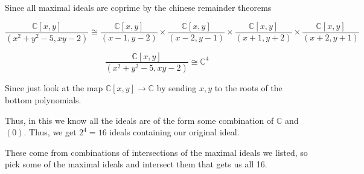 \documentclass[12pt, letterpaper]{article}
\newcommand{\C}{\mathbb{C}}
\begin{document}
Since all maximal ideals are coprime by the chinese remainder theorems

\[\dfrac{\C[x,y]}{(x^2+y^2-5,xy-2)} \cong \dfrac{\C[x,y]}{(x-1,y-2)} \times \dfrac{\C[x,y]}{(x-2,y-1)} \times \dfrac{\C[x,y]}{(x+1,y+2)} \times \dfrac{\C[x,y]}{(x+2,y+1)}\]

\[\dfrac{\C[x,y]}{(x^2+y^2-5,xy-2)} \cong \C^4\]

Since just look at the map $\C[x,y] \to \C$ by sending $x,y$ to the roots of the bottom polynomials.

Thus, in this we know all the ideals are of the form some combination of $\C$ and $(0)$. Thus, we get $2^4=16$ ideals containing our original ideal.

These come from combinations of intersections of the maximal ideals we listed, so pick some of the maximal ideals and intersect them that gets us all 16.
\end{document}
